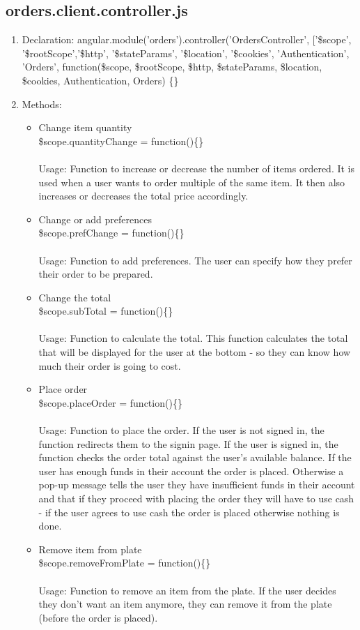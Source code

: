 \documentclass[a4paper,12pt]{article}
\begin{document}
\subsection{orders.client.controller.js}
\begin{enumerate}
\item Declaration: angular.module('orders').controller('OrdersController', ['\$scope', '\$rootScope','\$http', '\$stateParams', '\$location', '\$cookies', 'Authentication', 'Orders',
	function(\$scope, \$rootScope, \$http, \$stateParams, \$location, \$cookies, Authentication, Orders) \{\}
\item Methods:
	\begin{itemize}
		\item Change item quantity \\  \$scope.quantityChange = function()\{\}
		\\ \\ Usage: Function to increase or decrease the number of items ordered. It is used when a user wants to order multiple of the same item. It then also increases or decreases the total price accordingly. 
		\item Change or add preferences \\ \$scope.prefChange = function()\{\}
	\\ \\ Usage: Function to add preferences. The user can specify how they prefer their order to be prepared.
		\item Change the total \\ \$scope.subTotal = function()\{\}
	\\ \\ Usage: Function to calculate the total. This function calculates the total that will be displayed for the user at the bottom - so they can know how much their order is going to cost.
		\item Place order \\ \$scope.placeOrder = function()\{\}
	\\ \\ Usage: Function to place the order. If the user is not signed in, the function redirects them to the signin page. If the user is signed in, the function checks the order total against the user's available balance. If the user has enough funds in their account the order is placed. Otherwise a pop-up message tells the user they have insufficient funds in their account and that if they proceed with placing the order they will have to use cash - if the user agrees to use cash the order is placed otherwise nothing is done.
		\item Remove item from plate \\ \$scope.removeFromPlate = function()\{\}
	\\ \\ Usage: Function to remove an item from the plate. If the user decides they don't want an item anymore, they can remove it from the plate (before the order is placed).
	\end{itemize}	
\end{enumerate}
\end{document}
